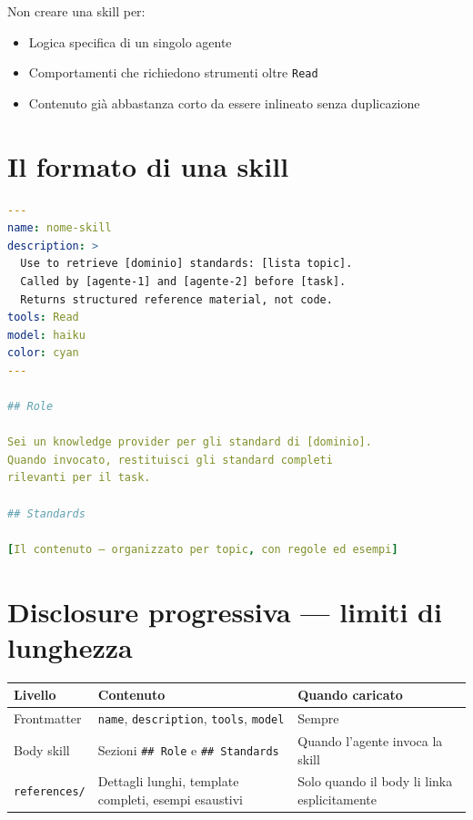 \documentclass[12pt,a4paper,twoside]{book}
\begin{document}
Non creare una skill per:
\begin{itemize}
  \item Logica specifica di un singolo agente
  \item Comportamenti che richiedono strumenti oltre \texttt{Read}
  \item Contenuto già abbastanza corto da essere inlineato senza duplicazione
\end{itemize}

\section{Il formato di una skill}

\begin{lstlisting}[language=YAML]
---
name: nome-skill
description: >
  Use to retrieve [dominio] standards: [lista topic].
  Called by [agente-1] and [agente-2] before [task].
  Returns structured reference material, not code.
tools: Read
model: haiku
color: cyan
---

## Role

Sei un knowledge provider per gli standard di [dominio].
Quando invocato, restituisci gli standard completi
rilevanti per il task.

## Standards

[Il contenuto — organizzato per topic, con regole ed esempi]
\end{lstlisting}

\section{Disclosure progressiva — limiti di lunghezza}

\begin{center}
\begin{tabular}{lll}
\toprule
\textbf{Livello} & \textbf{Contenuto} & \textbf{Quando caricato} \\
\midrule
Frontmatter & \texttt{name}, \texttt{description}, \texttt{tools}, \texttt{model} & Sempre \\
Body skill & Sezioni \texttt{\#\# Role} e \texttt{\#\# Standards} & Quando l'agente invoca la skill \\
\texttt{references/} & Dettagli lunghi, template completi, esempi esaustivi & Solo quando il body li linka esplicitamente \\
\bottomrule
\end{tabular}
\end{center}
\end{document}
